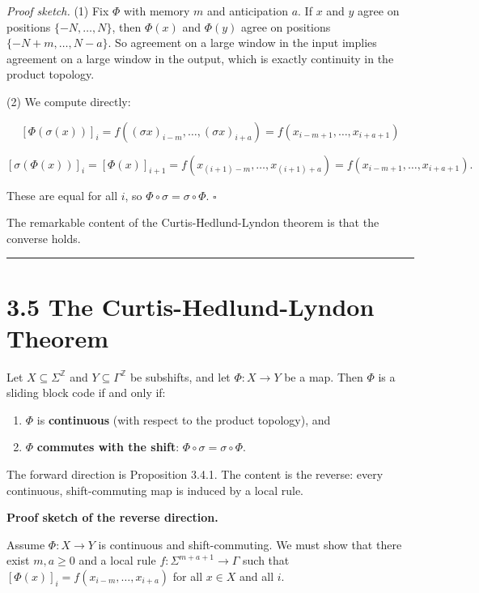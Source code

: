 \textit{Proof sketch.} (1) Fix $\Phi$ with memory $m$ and anticipation $a$. If $x$ and $y$ agree on positions $\{ -N, \ldots, N\} $, then $\Phi(x)$ and $\Phi(y)$ agree on positions $\{ -N+m, \ldots, N-a\} $. So agreement on a large window in the input implies agreement on a large window in the output, which is exactly continuity in the product topology.

(2) We compute directly:

\[
[\Phi(\sigma(x))]_i = f((\sigma x)_{i-m}, \ldots, (\sigma x)_{i+a}) = f(x_{i-m+1}, \ldots, x_{i+a+1})
\]

\[
[\sigma(\Phi(x))]_i = [\Phi(x)]_{i+1} = f(x_{(i+1)-m}, \ldots, x_{(i+1)+a}) = f(x_{i-m+1}, \ldots, x_{i+a+1}).
\]

These are equal for all $i$, so $\Phi \circ \sigma = \sigma \circ \Phi$. $\square$

The remarkable content of the Curtis-Hedlund-Lyndon theorem is that the converse holds.

\bigskip\hrule\bigskip

\section{3.5 The Curtis-Hedlund-Lyndon Theorem}

\begin{theorem}
Let $X \subseteq \Sigma^\mathbb{Z}$ and $Y \subseteq \Gamma^\mathbb{Z}$ be subshifts, and let $\Phi: X \to Y$ be a map. Then $\Phi$ is a sliding block code if and only if:
\end{theorem}

\begin{enumerate}
  \item $\Phi$ is \textbf{continuous} (with respect to the product topology), and
  \item $\Phi$ \textbf{commutes with the shift}: $\Phi \circ \sigma = \sigma \circ \Phi$.
\end{enumerate}

The forward direction is Proposition 3.4.1. The content is the reverse: every continuous, shift-commuting map is induced by a local rule.

\textbf{Proof sketch of the reverse direction.}

Assume $\Phi: X \to Y$ is continuous and shift-commuting. We must show that there exist $m, a \geq 0$ and a local rule $f: \Sigma^{m+a+1} \to \Gamma$ such that $[\Phi(x)]_i = f(x_{i-m}, \ldots, x_{i+a})$ for all $x \in X$ and all $i$.

